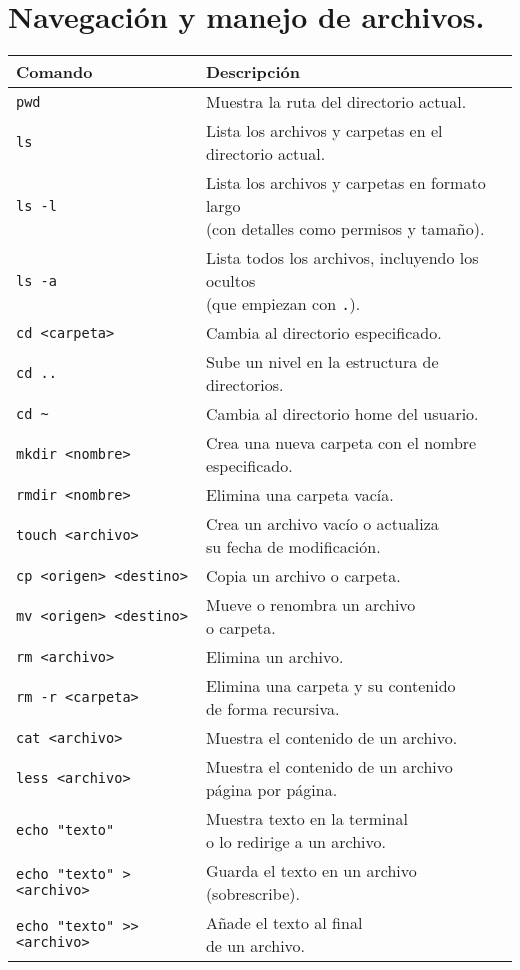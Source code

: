 \documentclass[10pt,a4paper]{book}
\begin{document}
\section{Navegación y manejo de archivos.}
\begin{tabularx}{\textwidth}{|l|X|} %
\hline
\textbf{Comando} & \textbf{Descripción} \\ \hline
\texttt{pwd} & Muestra la ruta del directorio actual. \\ \hline
\texttt{ls} & Lista los archivos y carpetas en el directorio actual. \\ \hline
\texttt{ls -l} & \makecell[l]{Lista los archivos y carpetas en formato largo \\ (con detalles como permisos y tamaño).} \\ \hline
\texttt{ls -a} & \makecell[l]{Lista todos los archivos, incluyendo los ocultos \\ (que empiezan con \texttt{.}).} \\ \hline
\texttt{cd <carpeta>} & Cambia al directorio especificado. \\ \hline
\texttt{cd ..} & Sube un nivel en la estructura de directorios. \\ \hline
\texttt{cd \textasciitilde} & Cambia al directorio home del usuario. \\ \hline
\texttt{mkdir <nombre>} & Crea una nueva carpeta con el nombre especificado. \\ \hline
\texttt{rmdir <nombre>} & Elimina una carpeta vacía. \\ \hline
\texttt{touch <archivo>} & \makecell[l]{Crea un archivo vacío o actualiza \\ su fecha de modificación.} \\ \hline
\texttt{cp <origen> <destino>} & Copia un archivo o carpeta. \\ \hline
\texttt{mv <origen> <destino>} & \makecell[l]{Mueve o renombra un archivo \\ o carpeta.} \\ \hline
\texttt{rm <archivo>} & Elimina un archivo. \\ \hline
\texttt{rm -r <carpeta>} & \makecell[l]{Elimina una carpeta y su contenido \\ de forma recursiva.} \\ \hline
\texttt{cat <archivo>} & Muestra el contenido de un archivo. \\ \hline
\texttt{less <archivo>} & \makecell[l]{Muestra el contenido de un archivo \\ página por página.} \\ \hline
\texttt{echo "texto"} & \makecell[l]{Muestra texto en la terminal \\ o lo redirige a un archivo.} \\ \hline
\texttt{echo "texto" > <archivo>} & \makecell[l]{Guarda el texto en un archivo \\ (sobrescribe).} \\ \hline
\texttt{echo "texto" >> <archivo>} & \makecell[l]{Añade el texto al final \\ de un archivo.} \\ \hline
\end{tabularx}
\newpage
\end{document}
